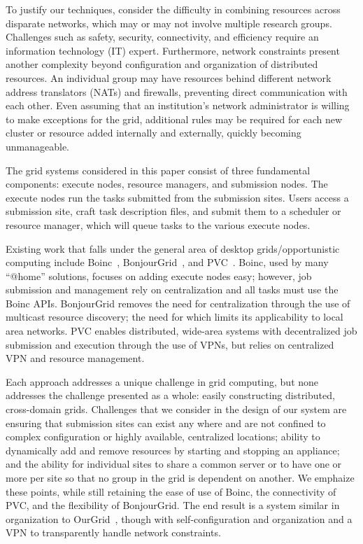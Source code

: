 \documentclass[workingdraft,endnotes]{usetex-v1}
\begin{document}
To justify our techniques, consider the difficulty in combining resources
across disparate networks, which may or may not involve multiple research
groups.  Challenges such as safety, security, connectivity, and efficiency
require an information technology (IT) expert.  Furthermore, network
constraints present another complexity beyond configuration and organization of
distributed resources.  An individual group may have resources behind different
network address translators (NATs) and firewalls, preventing direct
communication with each other.  Even assuming that an institution's network
administrator is willing to make exceptions for the grid, additional rules may
be required for each new cluster or resource added internally and externally,
quickly becoming unmanageable.

The grid systems considered in this paper consist of three fundamental
components:  execute nodes, resource managers, and submission nodes.  The
execute nodes run the tasks submitted from the submission sites.  Users access
a submission site, craft task description files, and submit them to a scheduler
or resource manager, which will queue tasks to the various execute nodes.

Existing work that falls under the general area of desktop grids/opportunistic
computing include Boinc~\cite{boinc}, BonjourGrid~\cite{bonjourgrid}, and
PVC~\cite{pvc}.  Boinc, used by many ``@home'' solutions, focuses on adding
execute nodes easy; however, job submission and management rely on
centralization and all tasks must use the Boinc APIs.  BonjourGrid removes the
need for centralization through the use of multicast resource discovery; the
need for which limits its applicability to local area networks.  PVC enables
distributed, wide-area systems with decentralized job submission and execution
through the use of VPNs, but relies on centralized VPN and resource management.

Each approach addresses a unique challenge in grid computing, but none
addresses the challenge presented as a whole: easily constructing distributed,
cross-domain grids.  Challenges that we consider in the design of our system
are ensuring that submission sites can exist any where and are not confined to
complex configuration or highly available, centralized locations; ability to
dynamically add and remove resources by starting and stopping an appliance; and
the ability for individual sites to share a common server or to have one or
more per site so that no group in the grid is dependent on another.  We
emphaize these points, while still retaining the ease of use of Boinc, the
connectivity of PVC, and the flexibility of BonjourGrid.  The end result is a
system similar in organization to OurGrid~\cite{ourgrid}, though with
self-configuration and organization and a VPN to transparently handle network
constraints.
\end{document}
